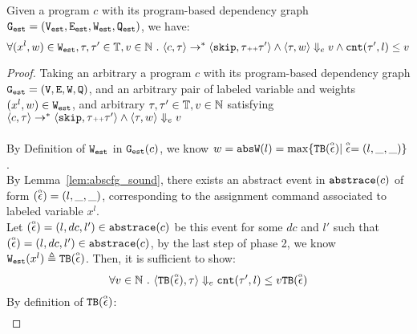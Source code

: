   {
  \begin{thm}
    \label{thm:rb_soundness}
  Given a program ${c}$ with its program-based dependency graph 
  $\progG = (\progV, \progE, \progW, \progF)$,
  we have:
  \[
  \forall (x^l, w) \in \progW, \vtrace, \trace' \in \mathbb{T},
  v \in \mathbb{N}
   \st 
  \config{{c}, \trace} \to^{*} \config{\eskip, \trace\tracecat\vtrace'} 
  \land 
  \config{\trace, w} \earrow v
  \land
  \vcounter(\vtrace', l) \leq v
  \]
  \end{thm}
  }
\begin{proof}
  Taking an arbitrary a program ${c}$ with its program-based dependency graph $\progG = (\vertxs, \edges, \weights, \qflag)$, 
  and an arbitrary pair of labeled variable and weights $(x^l, w) \in \progW$, 
  and arbitrary $\vtrace, \trace' \in \mathbb{T},
  v \in \mathbb{N}$ satisfying
  \\
  $\config{{c}, \trace} \to^{*} \config{\eskip, \trace\tracecat\vtrace'} 
  \land 
  \config{\trace, w} \earrow v$
  \\
  \\
  By Definition of $\progW$ in $\progG(c)$, we know 
  $  w = \absW(l) = \max \{ \absclr(\absevent) | \absevent = (l, \_, \_)\}$.
  \\
  By Lemma~\ref{lem:abscfg_sound}, there exists an abstract event in $\absflow(c)$ of form $(\absevent) = (l, \_, \_)$,
  corresponding to the assignment command associated to labeled variable $x^l$. 
  \\
  Let $(\absevent) = (l, dc, l') \in \absflow(c)$ be this event for some $dc$ and $l'$ such that  $(\absevent) = (l, dc, l') \in \absflow(c)$,
  by the last step of phase 2, we know
  $
  \progW(x^l) 
  \triangleq \absclr(\absevent)
  $.
   Then, it is sufficient to show:
  \[
  \forall v \in \mathbb{N} \st 
  \config{\absclr(\absevent), \trace} \earrow 
  \vcounter(\vtrace', l) \leq v
  \absclr(\absevent)
  \]
  By definition of $\absclr(\absevent)$:
  \[
 \begin{array}{ll}

\end{array}\]
\end{proof}
